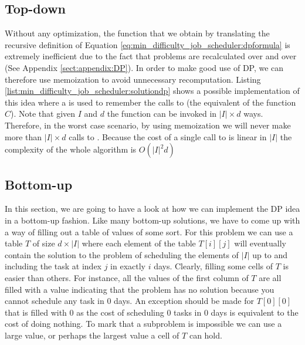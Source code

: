 \subsection{Top-down}
\label{sec:min_difficulty_job_scheduler_solution:dptopdown}
Without any optimization, the function that we obtain by translating the recursive definition of
Equation \ref{eq:min_difficulty_job_scheduler:dpformula} is extremely inefficient due to the fact that
problems are recalculated over and over (See Appendix \ref{sect:appendix:DP}). In order to make good
use of DP, we can therefore use memoization to avoid unnecessary recomputation. Listing
\ref{list:min_difficulty_job_scheduler:solutiondp} shows a possible implementation of this idea
where a  is used to remember the calls to 
(the equivalent of the function $C$). Note that given $I$ and $d$ the function can   be
invoked in $|I| \times d$ ways. Therefore, in the worst case scenario,  by using memoization we will never
make more than $|I| \times d$ calls to . Because the cost of a single
call to  is linear in $|I|$ the complexity of the whole algorithm is
$O(|I|^2 d)$



\subsection{Bottom-up}
In this section, we are going to have a look at how we can implement the DP idea in a bottom-up
fashion. Like many bottom-up solutions, we have to come up with a way of filling out a table of
values of some sort. For this problem we can use a table $T$ of size $d \times |I|$  where each
element of the table $T[i][j]$ will eventually contain the solution to the problem of scheduling the
elements of $|I|$ up to and including the task at index $j$ in exactly $i$ days. Clearly, filling
some cells of  $T$ is easier than others. For instance, all the values of the first column of $T$
are all filled with a value indicating that the problem has no solution because you cannot schedule
any task in $0$ days. An exception should be made for $T[0][0]$ that is filled with $0$ as the cost
of scheduling $0$ tasks in $0$ days is equivalent to the cost of doing nothing. To mark that a
subproblem is impossible we can use a large value, or perhaps the largest value a cell of $T$ can
hold. 

